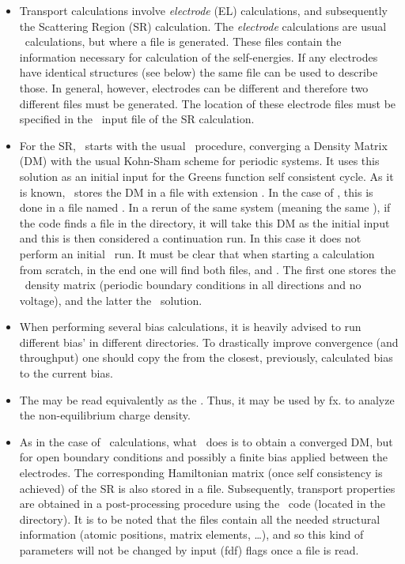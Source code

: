 \begin{itemize}
  \item%
  Transport calculations involve \emph{electrode} (EL) calculations,
  and subsequently the Scattering Region (SR) calculation. The
  \emph{electrode} calculations are usual \siesta\ calculations, but
  where a file  is generated. These files contain the
  information necessary for calculation of the self-energies. If any
  electrodes have identical structures (see below) the same
   file can be used to describe those. In general,
  however, electrodes can be different and therefore two different
   files must be generated. The location of these
  electrode files must be specified in the \fdflib\ input file of the SR
  calculation.

  \item %
  For the SR, \tsiesta\ starts with the usual \siesta\ procedure,
  converging a Density Matrix (DM) with the usual Kohn-Sham scheme for
  periodic systems. It uses this solution as an initial input for the
  Greens function self consistent cycle. As it is known, \siesta\
  stores the DM in a file with extension . In the case of
  \tsiesta, this is done in a file named . In a rerun of
  the same system (meaning the same \fdf{SystemLabel}), if the
  code finds a \sysfile{TSDE} file in the directory, it will take this
  DM as the initial input and this is then considered a continuation
  run. In this case it does not perform an initial \siesta\ run. It
  must be clear that when starting a calculation from scratch, in the
  end one will find both files, \sysfile{DM} and \sysfile{TSDE}.
  The first one stores the \siesta\ density matrix (periodic boundary
  conditions in all directions and no voltage), and the latter the
  \tsiesta\ solution. 

  \item %
  When performing several bias calculations, it is heavily advised to
  run different bias' in different directories. To drastically improve
  convergence (and throughput) one should copy the \sysfile{TSDE} from
  the closest, previously, calculated bias to the current bias.
  
  \item %
  The  may be read equivalently as the
  . Thus, it may be used by fx.  to
  analyze the non-equilibrium charge density.

  \item %
  As in the case of \siesta\ calculations, what \tsiesta\ does is to
  obtain a converged DM, but for open boundary conditions and possibly
  a finite bias applied between the electrodes. The corresponding
  Hamiltonian matrix (once self consistency is achieved) of the SR is
  also stored in a \sysfile{TSHS} file. Subsequently, transport
  properties are obtained in a post-processing procedure using the
  \tbtrans\ code (located in the \program{Util/TS/TBtrans}
  directory). It is to be noted that the  files contain
  all the needed structural information (atomic positions, matrix
  elements, \ldots), and so this kind of parameters will not be
  changed by input (fdf) flags once a  file is read.


\end{itemize}
